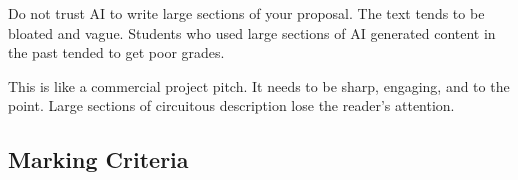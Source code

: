 \documentclass{csse4400}
\begin{document}
Do not trust AI to write large sections of your proposal.
The text tends to be bloated and vague.
Students who used large sections of AI generated content in the past tended to get poor grades.

This is like a commercial project pitch.
It needs to be sharp, engaging, and to the point.
Large sections of circuitous description lose the reader's attention.


\clearpage
{}
\begin{landscape}

\section*{Marking Criteria}

\fontsize{9}{11}\selectfont


\end{landscape}
\end{document}
